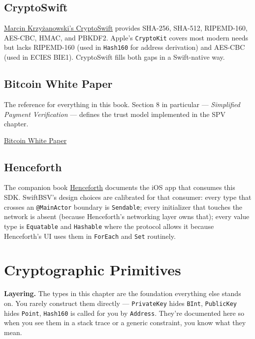 \documentclass[a4paper, 11pt, openany]{book}
\begin{document}
\section{CryptoSwift}

\href{https://github.com/krzyzanowskim/CryptoSwift}{Marcin Krzy\.{z}anowski's CryptoSwift} provides SHA-256, SHA-512, RIPEMD-160, AES-CBC, HMAC, and PBKDF2. Apple's \texttt{CryptoKit} covers most modern needs but lacks RIPEMD-160 (used in \texttt{Hash160} for address derivation) and AES-CBC (used in ECIES BIE1). CryptoSwift fills both gaps in a Swift-native way.

\section{Bitcoin White Paper}

The reference for everything in this book. Section 8 in particular --- \emph{Simplified Payment Verification} --- defines the trust model implemented in the SPV chapter.

\href{https://craigwright.net/bitcoin-white-paper.pdf}{Bitcoin White Paper}

\section{Henceforth}

The companion book \href{https://github.com/henryhudson/FORTHapp}{Henceforth} documents the iOS app that consumes this SDK. SwiftBSV's design choices are calibrated for that consumer: every type that crosses an \texttt{@MainActor} boundary is \texttt{Sendable}; every initializer that touches the network is absent (because Henceforth's networking layer owns that); every value type is \texttt{Equatable} and \texttt{Hashable} where the protocol allows it because Henceforth's UI uses them in \texttt{ForEach} and \texttt{Set} routinely.

\chapter{Cryptographic Primitives}

\begin{notebox}
\textbf{Layering.} The types in this chapter are the foundation everything else stands on. You rarely construct them directly --- \texttt{PrivateKey} hides \texttt{BInt}, \texttt{PublicKey} hides \texttt{Point}, \texttt{Hash160} is called for you by \texttt{Address}. They're documented here so when you see them in a stack trace or a generic constraint, you know what they mean.
\end{notebox}
\end{document}
